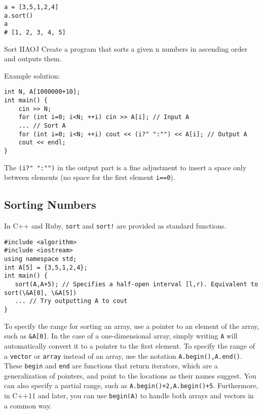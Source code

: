 \begin{pybox}[emph=sort]
\begin{verbatim}
a = [3,5,1,2,4]
a.sort()
a
# [1, 2, 3, 4, 5]
\end{verbatim}
\end{pybox}


\begin{psbox}{Sort II}{AOJ}
Create a program that sorts a given n numbers in ascending order and outputs them.

\end{psbox}

Example solution:
\begin{cbox}
\begin{verbatim}
int N, A[1000000+10];
int main() {
    cin >> N;
    for (int i=0; i<N; ++i) cin >> A[i]; // Input A
    ... // Sort A
    for (int i=0; i<N; ++i) cout << (i?" ":"") << A[i]; // Output A
    cout << endl;
}
\end{verbatim}
\end{cbox}

The \texttt{(i?" ":"")} in the output part is a fine adjustment to insert a space only between elements (no space for the first element \texttt{i==0}).
\subsection{Sorting Numbers}\label{section:sort}

In C++ and Ruby, \texttt{sort} and \texttt{sort!} are provided as standard functions.
\begin{cbox}[emph={algorithm,sort}]
\begin{verbatim}
#include <algorithm>
#include <iostream>
using namespace std;
int A[5] = {3,5,1,2,4};
int main() {
   sort(A,A+5); // Specifies a half-open interval [l,r). Equivalent to sort(\&A[0], \&A[5])
   ... // Try outputting A to cout
}
\end{verbatim}
\end{cbox}
To specify the range for sorting an array, use a pointer to an element of the array, such as \texttt{\&A[0]}. In the case of a one-dimensional array, simply writing \texttt{A} will automatically convert it to a pointer to the first element.
To specify the range of a \texttt{vector} or \texttt{array} instead of an array, use the notation \texttt{A.begin(),A.end()}. These \texttt{begin} and \texttt{end} are functions that return iterators, which are a generalization of pointers, and point to the locations as their names suggest. You can also specify a partial range, such as \texttt{A.begin()+2,A.begin()+5}. Furthermore, in C++11 and later, you can use \texttt{begin(A)} to handle both arrays and vectors in a common way.

